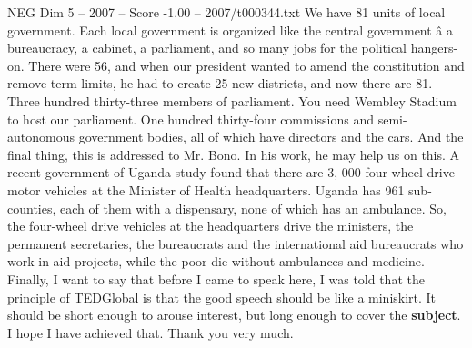 \begin{textsample}{NEG Dim 5 – 2007 – Score -1.00 – 2007/t000344.txt}
We have 81 units of local government.
Each local government is organized like the central government â a bureaucracy, a cabinet, a parliament, and so many jobs for the political hangers-on.
There were 56, and when our president wanted to amend the constitution and remove term limits, he had to create 25 new districts, and now there are 81.
Three hundred thirty-three members of parliament.
You need Wembley Stadium to host our parliament.
One hundred thirty-four commissions and semi-autonomous government bodies, all of which have directors and the cars.
And the final thing, this is addressed to Mr.
Bono.
In his work, he may help us on this.
A recent government of Uganda study found that there are 3, 000 four-wheel drive motor vehicles at the Minister of Health headquarters.
Uganda has 961 sub- counties, each of them with a dispensary, none of which has an ambulance.
So, the four-wheel drive vehicles at the headquarters drive the ministers, the permanent secretaries, the bureaucrats and the international aid bureaucrats who work in aid projects, while the poor die without ambulances and medicine.
Finally, I want to say that before I came to speak here, I was told that the principle of TEDGlobal is that the good speech should be like a miniskirt.
It should be short enough to arouse interest, but long enough to cover the \textbf{subject}.
I hope I have achieved that.
Thank you very much.

\end{textsample}
